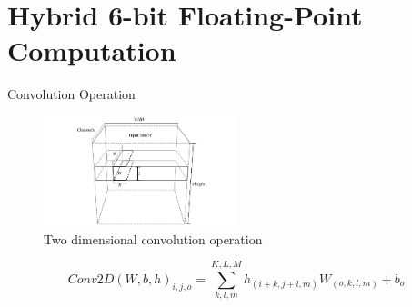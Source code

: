 \section{Hybrid 6-bit Floating-Point Computation}
\tableofcontents[currentsection]

\begin{frame}{Convolution Operation}
	\begin{figure}
		\centering
		\includegraphics[width=0.5\textwidth]{../figures/convolution.pdf}
		\caption{ Two dimensional convolution operation}
	\end{figure}
	
	
	{\scriptsize
		\[
Conv2D\left(W,b,h\right)_{i,j,o}=\sum_{k,l,m}^{K,L,M} h_{(i+k,j+l,m)} W_{(o,k,l,m)}+b_{o}
		\]
	}
\end{frame}

